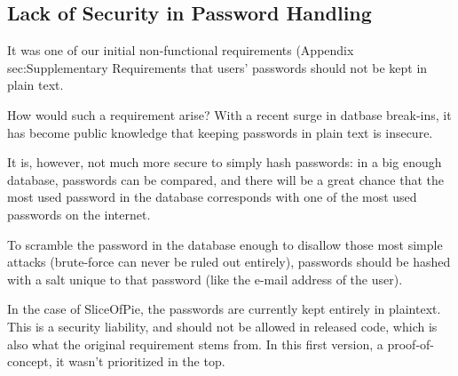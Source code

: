 \subsection{Lack of Security in Password Handling}

It was one of our initial non-functional requirements (Appendix {sec:Supplementary Requirements} that
users' passwords should not be kept in plain text.

How would such a requirement arise? With a recent surge in datbase break-ins\cite{lulzsec0711}, it has
become public knowledge that keeping passwords in plain text is insecure.

It is, however, not much more secure to simply hash passwords: in a big enough database, passwords can be
compared, and there will be a great chance that the most used password in the database corresponds with one
of the most used passwords on the internet\cite{toppasswords}.

To scramble the password in the database enough to disallow those most simple attacks (brute-force can never
be ruled out entirely), passwords should be hashed with a salt unique to that password (like the e-mail address
of the user).

In the case of SliceOfPie, the passwords are currently kept entirely in plaintext. This is a security liability,
and should not be allowed in released code, which is also what the original requirement stems from. In this first
version, a proof-of-concept, it wasn't prioritized in the top.